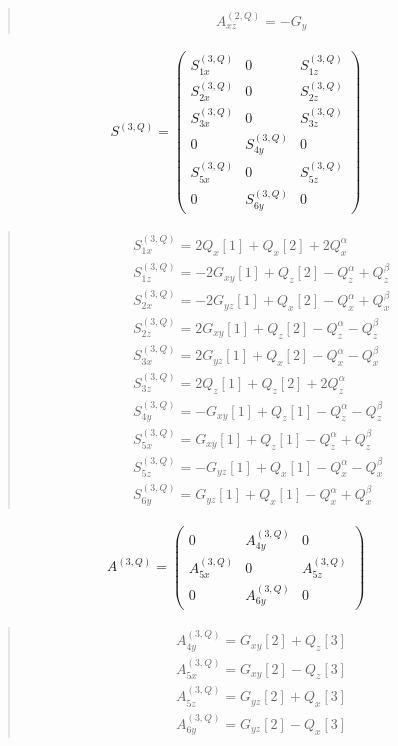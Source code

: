 \documentclass[fleqn,10pt]{jsarticle}
\begin{document}
\begin{quote}
\begin{align*}
& A^{(2,Q)}_{xz} = - G_{y}
\end{align*}
\end{quote}
\begin{align*}
S^{(3,Q)} = \begin{pmatrix} S^{(3,Q)}_{1x} & 0 & S^{(3,Q)}_{1z} \\ S^{(3,Q)}_{2x} & 0 & S^{(3,Q)}_{2z} \\ S^{(3,Q)}_{3x} & 0 & S^{(3,Q)}_{3z} \\ 0 & S^{(3,Q)}_{4y} & 0 \\ S^{(3,Q)}_{5x} & 0 & S^{(3,Q)}_{5z} \\ 0 & S^{(3,Q)}_{6y} & 0 \end{pmatrix}
\end{align*}
\begin{quote}
\begin{align*}
& S^{(3,Q)}_{1x} = 2 Q_{x}[1] + Q_{x}[2] + 2 Q_{x}^{\alpha} \\
& S^{(3,Q)}_{1z} = - 2 G_{xy}[1] + Q_{z}[2] - Q_{z}^{\alpha} + Q_{z}^{\beta} \\
& S^{(3,Q)}_{2x} = - 2 G_{yz}[1] + Q_{x}[2] - Q_{x}^{\alpha} + Q_{x}^{\beta} \\
& S^{(3,Q)}_{2z} = 2 G_{xy}[1] + Q_{z}[2] - Q_{z}^{\alpha} - Q_{z}^{\beta} \\
& S^{(3,Q)}_{3x} = 2 G_{yz}[1] + Q_{x}[2] - Q_{x}^{\alpha} - Q_{x}^{\beta} \\
& S^{(3,Q)}_{3z} = 2 Q_{z}[1] + Q_{z}[2] + 2 Q_{z}^{\alpha} \\
& S^{(3,Q)}_{4y} = - G_{xy}[1] + Q_{z}[1] - Q_{z}^{\alpha} - Q_{z}^{\beta} \\
& S^{(3,Q)}_{5x} = G_{xy}[1] + Q_{z}[1] - Q_{z}^{\alpha} + Q_{z}^{\beta} \\
& S^{(3,Q)}_{5z} = - G_{yz}[1] + Q_{x}[1] - Q_{x}^{\alpha} - Q_{x}^{\beta} \\
& S^{(3,Q)}_{6y} = G_{yz}[1] + Q_{x}[1] - Q_{x}^{\alpha} + Q_{x}^{\beta}
\end{align*}
\end{quote}
\begin{align*}
A^{(3,Q)} = \begin{pmatrix} 0 & A^{(3,Q)}_{4y} & 0 \\ A^{(3,Q)}_{5x} & 0 & A^{(3,Q)}_{5z} \\ 0 & A^{(3,Q)}_{6y} & 0 \end{pmatrix}
\end{align*}
\begin{quote}
\begin{align*}
& A^{(3,Q)}_{4y} = G_{xy}[2] + Q_{z}[3] \\
& A^{(3,Q)}_{5x} = G_{xy}[2] - Q_{z}[3] \\
& A^{(3,Q)}_{5z} = G_{yz}[2] + Q_{x}[3] \\
& A^{(3,Q)}_{6y} = G_{yz}[2] - Q_{x}[3]
\end{align*}
\end{quote}
\end{document}
